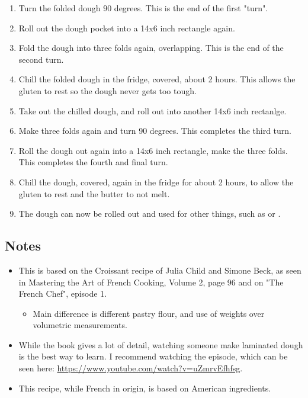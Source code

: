\begin{multicols}{2}
\begin{enumerate}
    \item Turn the folded dough 90 degrees. This is the end of the first "turn".
    \item Roll out the dough pocket into a 14x6 inch rectangle again.
    \item Fold the dough into three folds again, overlapping. This is the end of the second turn.
    \item Chill the folded dough in the fridge, covered, about 2 hours. This allows the gluten to rest so the dough never gets too tough.
    \item Take out the chilled dough, and roll out into another 14x6 inch rectanlge.
    \item Make three folds again and turn 90 degrees. This completes the third turn.
    \item Roll the dough out again into a 14x6 inch rectangle, make the three folds. This completes the fourth and final turn.
    \item Chill the dough, covered, again in the fridge for about 2 hours, to allow the gluten to rest and the butter to not melt.
    \item The dough can now be rolled out and used for other things, such as  or .
    
\end{enumerate}

\subsection*{Notes}
\begin{itemize}
    \item This is based on the Croissant recipe of Julia Child and Simone Beck, as seen in Mastering the Art of French Cooking, Volume 2, page 96 and on "The French Chef", episode 1. 
    \begin{itemize}
        \item Main difference is different pastry flour, and use of weights over volumetric measurements.
    \end{itemize}
    \item While the book gives a lot of detail, watching someone make laminated dough is the best way to learn. I recommend watching the episode, which can be seen here: \url{https://www.youtube.com/watch?v=uZmrvEfhfsg}.
    \item This recipe, while French in origin, is based on American ingredients.
\end{itemize}
\end{multicols}
\clearpage